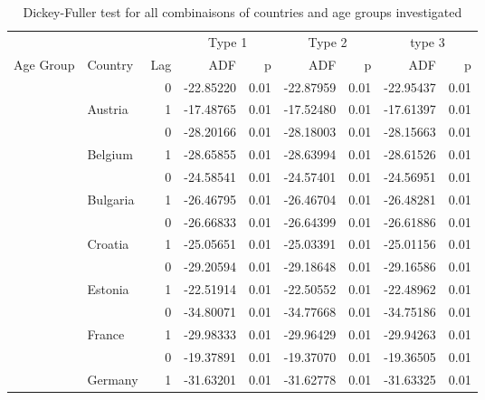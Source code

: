 \documentclass[
]{article}
\begin{document}
\begin{table}
\centering
\caption{\label{tab:unnamed-chunk-4}Dickey-Fuller test for all combinaisons of countries and age groups investigated}
\centering
\begin{tabular}[t]{l|l|r|r|r|r|r|r|r}
\hline
\multicolumn{3}{c|}{ } & \multicolumn{2}{c|}{Type 1} & \multicolumn{2}{c|}{Type 2} & \multicolumn{2}{c}{type 3} \\
\cline{4-5} \cline{6-7} \cline{8-9}
Age Group & Country & Lag & ADF & p & ADF & p & ADF & p\\
\hline
 &  & 0 & -22.85220 & 0.01 & -22.87959 & 0.01 & -22.95437 & 0.01\\
\cline{3-9}
 & \multirow{-2}{*}{\raggedright\arraybackslash Austria} & 1 & -17.48765 & 0.01 & -17.52480 & 0.01 & -17.61397 & 0.01\\
\cline{2-9}
 &  & 0 & -28.20166 & 0.01 & -28.18003 & 0.01 & -28.15663 & 0.01\\
\cline{3-9}
 & \multirow{-2}{*}{\raggedright\arraybackslash Belgium} & 1 & -28.65855 & 0.01 & -28.63994 & 0.01 & -28.61526 & 0.01\\
\cline{2-9}
 &  & 0 & -24.58541 & 0.01 & -24.57401 & 0.01 & -24.56951 & 0.01\\
\cline{3-9}
 & \multirow{-2}{*}{\raggedright\arraybackslash Bulgaria} & 1 & -26.46795 & 0.01 & -26.46704 & 0.01 & -26.48281 & 0.01\\
\cline{2-9}
 &  & 0 & -26.66833 & 0.01 & -26.64399 & 0.01 & -26.61886 & 0.01\\
\cline{3-9}
 & \multirow{-2}{*}{\raggedright\arraybackslash Croatia} & 1 & -25.05651 & 0.01 & -25.03391 & 0.01 & -25.01156 & 0.01\\
\cline{2-9}
 &  & 0 & -29.20594 & 0.01 & -29.18648 & 0.01 & -29.16586 & 0.01\\
\cline{3-9}
 & \multirow{-2}{*}{\raggedright\arraybackslash Estonia} & 1 & -22.51914 & 0.01 & -22.50552 & 0.01 & -22.48962 & 0.01\\
\cline{2-9}
 &  & 0 & -34.80071 & 0.01 & -34.77668 & 0.01 & -34.75186 & 0.01\\
\cline{3-9}
 & \multirow{-2}{*}{\raggedright\arraybackslash France} & 1 & -29.98333 & 0.01 & -29.96429 & 0.01 & -29.94263 & 0.01\\
\cline{2-9}
 &  & 0 & -19.37891 & 0.01 & -19.37070 & 0.01 & -19.36505 & 0.01\\
\cline{3-9}
 & \multirow{-2}{*}{\raggedright\arraybackslash Germany} & 1 & -31.63201 & 0.01 & -31.62778 & 0.01 & -31.63325 & 0.01\\

\end{tabular}
\end{table}
\end{document}
